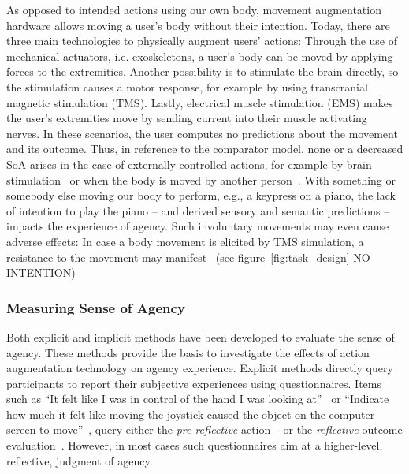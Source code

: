 As opposed to intended actions using our own body, movement augmentation hardware allows moving a user's body without their intention. Today, there are three main technologies to physically augment users' actions: Through the use of mechanical actuators, i.e. exoskeletons, a user's body can be moved by applying forces to the extremities. Another possibility is to stimulate the brain directly, so the stimulation causes a motor response, for example by using transcranial magnetic stimulation (TMS). Lastly, electrical muscle stimulation (EMS) makes the user's extremities move by sending current into their muscle activating nerves. In these scenarios, the user computes no predictions about the movement and its outcome. Thus, in reference to the comparator model, none or a decreased SoA arises in the case of externally controlled actions, for example by brain stimulation~\cite{Haggard2002-sz} or when the body is moved by another person~\cite{Kuhn2013-ls}. With something or somebody else moving our body to perform, e.g., a keypress on a piano, the lack of intention to play the piano -- and derived sensory and semantic predictions -- impacts the experience of agency. Such involuntary movements may even cause adverse effects: In case a body movement is elicited by TMS simulation, a resistance to the movement may manifest~\cite{Haggard2002-sz} (see figure~\ref{fig:task_design} NO INTENTION)

\subsubsection{Measuring Sense of Agency}
Both explicit and implicit methods have been developed to evaluate the sense of agency. These methods provide the basis to investigate the effects of action augmentation technology on agency experience. Explicit methods directly query participants to report their subjective experiences using questionnaires. Items such as ``It felt like I was in control of the hand I was looking at''~\cite{Haggard2002-sz} or ``Indicate how much it felt like moving the joystick caused the object on the computer screen to move''~\cite{Ebert2010-lu}, query either the \textit{pre-reflective} action -- or the \textit{reflective} outcome evaluation~\cite{Moore2012-dk}. However, in most cases such questionnaires aim at a higher-level, reflective, judgment of agency. 

